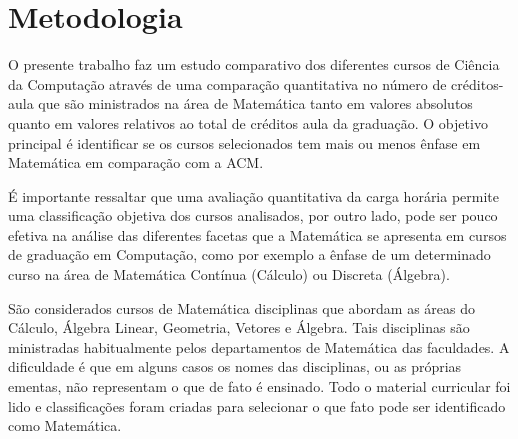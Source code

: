 \documentclass[conference]{IEEEtran}
\begin{document}
\section{Metodologia}
	O presente trabalho faz um estudo comparativo dos diferentes cursos de Ciência da Computação através de uma comparação quantitativa no número de créditos-aula que são ministrados na área de Matemática tanto em valores absolutos quanto em valores relativos ao total de créditos aula da graduação. O objetivo principal é identificar se os cursos selecionados tem mais ou menos ênfase em Matemática em comparação com a ACM. 
	
	É importante ressaltar que uma avaliação quantitativa da carga horária permite uma classificação objetiva dos cursos analisados, por outro lado, pode ser pouco efetiva na análise das diferentes facetas que a Matemática se apresenta em cursos de graduação em Computação, como por exemplo a ênfase de um determinado curso na área de Matemática Contínua (Cálculo) ou Discreta (Álgebra).




	São considerados cursos de Matemática disciplinas que abordam as áreas do Cálculo, Álgebra Linear, Geometria, Vetores e Álgebra. Tais disciplinas são ministradas habitualmente pelos departamentos de Matemática das faculdades. A dificuldade é que em alguns casos os nomes das disciplinas, ou as próprias ementas, não representam o que de fato é ensinado. Todo o material curricular foi lido e classificações foram criadas para selecionar o que fato pode ser identificado como Matemática. 
\end{document}
